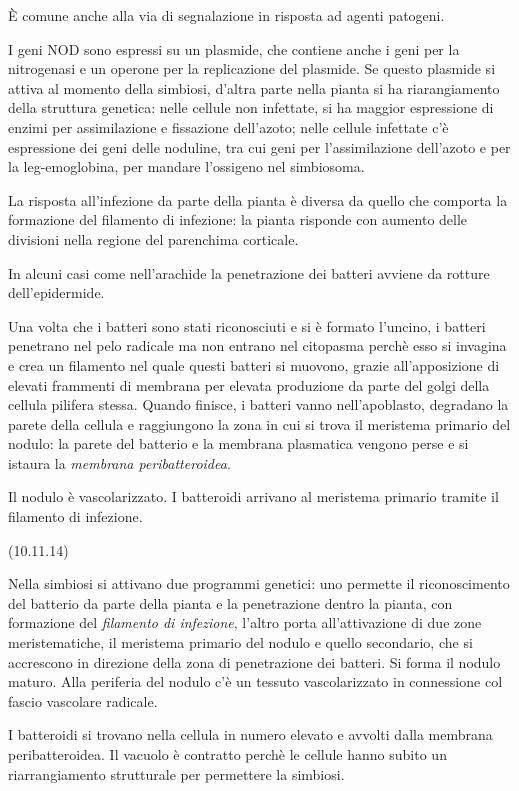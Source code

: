 \documentclass[a4paper,12pt]{book}
\begin{document}
È comune anche alla via di segnalazione in risposta ad agenti patogeni.

I geni NOD sono espressi su un plasmide, che contiene anche i geni per la nitrogenasi e un operone per la replicazione del plasmide.
Se questo plasmide si attiva al momento della simbiosi, d'altra parte nella pianta si ha riarangiamento della struttura genetica: nelle cellule non infettate, si ha maggior espressione di enzimi per assimilazione e fissazione dell'azoto; nelle cellule infettate c'è espressione dei geni delle noduline, tra cui geni per l'assimilazione dell'azoto e per la leg-emoglobina, per mandare l'ossigeno nel simbiosoma.

La risposta all'infezione da parte della pianta è diversa da quello che comporta la formazione del filamento di infezione: la pianta risponde con aumento delle divisioni nella regione del parenchima corticale.

In alcuni casi come nell'arachide la penetrazione dei batteri avviene da rotture dell'epidermide.

Una volta che i batteri sono stati riconosciuti e si è formato l'uncino, i batteri penetrano nel pelo radicale ma non entrano nel citopasma perchè esso si invagina e crea un filamento nel quale questi batteri si muovono, grazie all'apposizione di elevati frammenti di membrana per elevata produzione da parte del golgi della cellula pilifera stessa. Quando finisce, i batteri vanno nell'apoblasto, degradano la parete della cellula e raggiungono la zona in cui si trova il meristema primario del nodulo: la parete del batterio e la membrana plasmatica vengono perse e si istaura la \emph{membrana peribatteroidea}.

Il nodulo è vascolarizzato. I batteroidi arrivano al meristema primario tramite il filamento di infezione.

(10.11.14)

Nella simbiosi si attivano due programmi genetici: uno permette il riconoscimento del batterio da parte della pianta e la penetrazione dentro la pianta, con formazione del \emph{filamento di infezione}, l'altro porta all'attivazione di due zone meristematiche, il meristema primario del nodulo e quello secondario, che si accrescono in direzione della zona di penetrazione dei batteri. Si forma il nodulo maturo.
Alla periferia del nodulo c'è un tessuto vascolarizzato in connessione col fascio vascolare radicale. 

I batteroidi si trovano nella cellula in numero elevato e avvolti dalla membrana peribatteroidea. Il vacuolo è contratto perchè le cellule hanno subito un riarrangiamento strutturale per permettere la simbiosi.
\end{document}
